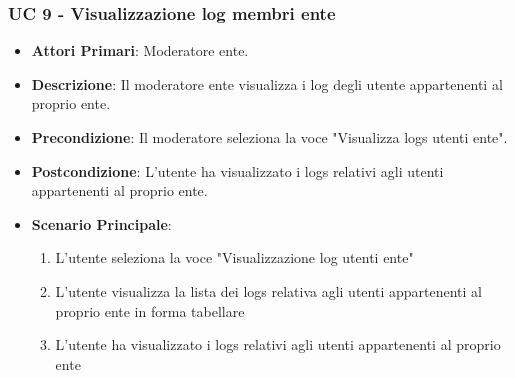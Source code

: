 		\subsubsection{UC 9 - Visualizzazione log membri ente}
		\begin{itemize}
			\item \textbf{Attori Primari}: Moderatore ente.
			\item \textbf{Descrizione}: Il moderatore ente visualizza i log degli utente appartenenti al proprio ente.
			\item \textbf{Precondizione}: Il moderatore seleziona la voce "Visualizza logs utenti ente".
			\item \textbf{Postcondizione}: L'utente ha visualizzato i logs relativi agli utenti appartenenti al proprio ente.
			\item \textbf{Scenario Principale}:
			\begin{enumerate}
				\item{L'utente seleziona la voce "Visualizzazione log utenti ente"}
				\item{L'utente visualizza la lista dei logs relativa agli utenti appartenenti al proprio ente in forma tabellare}
				\item{L'utente ha visualizzato i logs relativi agli utenti appartenenti al proprio ente}
			\end{enumerate}	
		\end{itemize}


		



		



		


